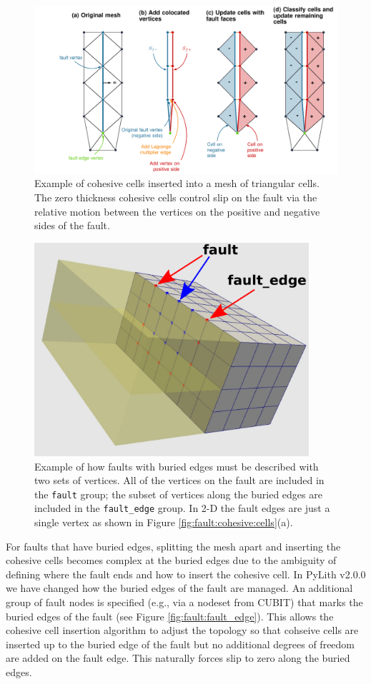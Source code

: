 \begin{figure}[htbp]
  \includegraphics[width=6.25in]{boundaryconditions/figs/cohesivecell}
  \caption{Example of cohesive cells inserted into a mesh of
    triangular cells.  The zero thickness cohesive cells control slip
    on the fault via the relative motion between the vertices on the
    positive and negative sides of the fault.}
  \label{fig:fault:cohesive:cells} 
\end{figure}

\begin{figure}[htbp]
  \includegraphics[width=4in]{boundaryconditions/figs/faultEdge}
  \caption{Example of how faults with buried edges must be described
    with two sets of vertices. All of the vertices on the fault are
    included in the \texttt{fault} group; the subset of vertices along
    the buried edges are included in the \texttt{fault\_edge}
    group. In 2-D the fault edges are just a single vertex as shown in
    Figure
    \vref{fig:fault:cohesive:cells}(a).}
  \label{fig:fault:fault_edge}
\end{figure}
For faults that have buried edges, splitting the mesh apart and inserting
the cohesive cells becomes complex at the buried edges due to the
ambiguity of defining where the fault ends and how to insert the cohesive
cell. In PyLith v2.0.0 we have changed how the buried edges of the
fault are managed. An additional group of fault nodes is specified
(e.g., via a nodeset from CUBIT) that marks the buried edges of the
fault (see Figure \vref{fig:fault:fault_edge}). This allows the cohesive
cell insertion algorithm to adjust the topology so that cohseive cells
are inserted up to the buried edge of the fault but no additional
degrees of freedom are added on the fault edge. This naturally forces
slip to zero along the buried edges.

